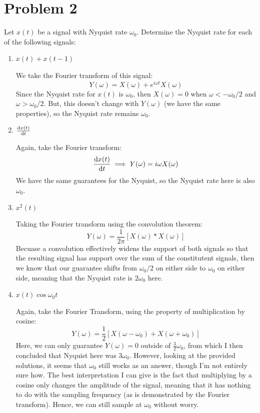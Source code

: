 \documentclass[10pt]{article}
\begin{document}
	\section*{Problem 2}
	Let \( x(t) \) be a signal with Nyquist rate \( \omega_0 \). Determine the Nyquist rate for each of the 
	following signals:
	\begin{enumerate}[label=\alph*)]
		\item \( x(t) + x(t - 1) \) 
			
			\begin{solution}
				We take the Fourier transform of this signal:
				\[
				Y(\omega) = X(\omega) + e^{i \omega t}X(\omega)
				\] 
				Since the Nyquist rate for \( x(t) \) is \( \omega_0 \), then \( X(\omega) = 0 \) when 
				\( \omega < - \omega_0 / 2 \) and \( \omega > \omega_0 / 2 \). But, this doesn't change 
				with \( Y(\omega) \) (we have the same properties), so the Nyquist rate remains \( \omega_0 \). 
			\end{solution}
		\item \( \dv{x(t)}{t} \) 

			\begin{solution}
				Again, take the Fourier transform:
				\[
					\dv{x(t)}{t} \implies Y(\omega) = i \omega X(\omega)
				\] 
				We have the same guarantees for the Nyquist, so the Nyquist rate here is  also \( \omega_0 \). 
			\end{solution}
		\item \( x^2(t) \) 

			\begin{solution}
				Taking the Fourier transform using the convolution theorem:
				\[
					Y(\omega) = \frac{1}{2\pi}[X(\omega) * X(\omega)]
				\] 
				Becuase a convolution effectively widens the support of both signals so that the resulting signal 
				has support over the sum of the constitutent signals, then we know that our guarantee shifts
				from \( \omega_0 / 2 \) on either side to \( \omega_0 \) on either side, meaning that 
				the Nyquist rate is \( 2\omega_0 \) here. 
			\end{solution}
		\item \( x(t) \cos \omega_0 t \) 

			\begin{solution}
				Again, take the Fourier Transform, using the property of multiplication by cosine: 
				\[
					Y(\omega) = \frac{1}{2}[X(\omega - \omega_0) + X(\omega + \omega_0)]
				\] 
				Here, we can only guarantee \( Y(\omega) = 0 \) outside of \( \frac{3}{2}\omega_0 \), from which 
				I then concluded that Nyquist here was \( 3 \omega_0 \). However, looking at the provided solutions, 
				it seems that  \( \omega_0 \) still works as an answer, though I'm not entirely sure how. 
				The best interpretation I can give is the fact that multiplying by a cosine 
				only changes the amplitude of the signal, meaning that it has nothing to do with the sampling 
				frequency (as is demonstrated by the Fourier transform). Hence, we can still sample at \( \omega_0 \) 
				without worry.
			\end{solution}
	\end{enumerate}
	\pagebreak
\end{document}
